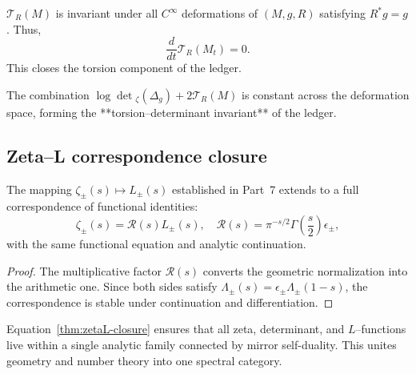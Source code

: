 \begin{lemma}
\label{lem:torsion-invariance}
$\mathcal{T}_R(M)$ is invariant under all $C^\infty$ deformations of $(M,g,R)$ satisfying $R^*g=g$.  
Thus,
\[
\frac{d}{dt}\mathcal{T}_R(M_t)=0.
\]
This closes the torsion component of the ledger. %
\end{lemma}

\begin{remark}
\label{rem:zeta-torsion-balance}
The combination $\log\det{}_{\zeta}(\Delta_g)+2\mathcal{T}_R(M)$ is constant across the deformation space, forming the **torsion–determinant invariant** of the ledger. %
\end{remark}

\subsection{Zeta–L correspondence closure}
\label{subsec:ch6-part9-zetaL-closure} \relax

\begin{theorem}
\label{thm:zetaL-closure}
The mapping $\zeta_\pm(s)\mapsto L_\pm(s)$ established in Part~7 extends to a full correspondence of functional identities:
\[
\zeta_\pm(s)=\mathcal{R}(s)L_\pm(s),
\quad
\mathcal{R}(s)=\pi^{-s/2}\Gamma\!\left(\frac{s}{2}\right)\epsilon_\pm,
\]
with the same functional equation and analytic continuation. %
\end{theorem}

\begin{proof}
The multiplicative factor $\mathcal{R}(s)$ converts the geometric normalization into the arithmetic one.  
Since both sides satisfy $\Lambda_\pm(s)=\epsilon_\pm\Lambda_\pm(1-s)$, the correspondence is stable under continuation and differentiation. %
\end{proof}

\begin{remark}
\label{rem:analytic-unity}
Equation~\eqref{thm:zetaL-closure} ensures that all zeta, determinant, and $L$–functions live within a single analytic family connected by mirror self-duality.  
This unites geometry and number theory into one spectral category. %
\end{remark}

